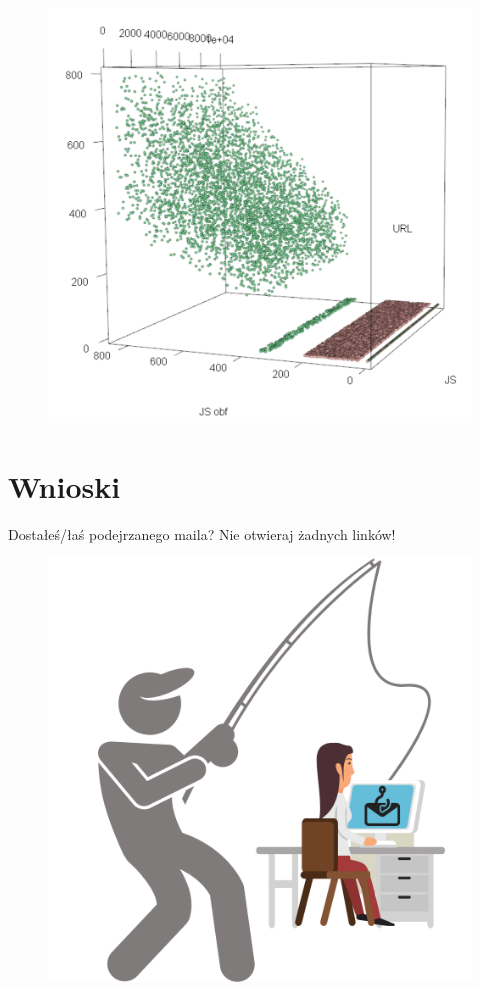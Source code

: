\documentclass{beamer}
\begin{document}
\begin{frame}
	\begin{figure}
		\centering
		\includegraphics[width=0.7\linewidth]{../images/plot_9}
	\end{figure}
\end{frame}

\section{Wnioski}
\begin{frame}
	\begin{center}
		\huge{Dostałeś/łaś podejrzanego maila? Nie otwieraj żadnych linków!}
	\end{center}
	\begin{figure}
		\centering
		\includegraphics[width=0.5\linewidth]{../images/rys_15}
	\end{figure}
\end{frame}
\end{document}
